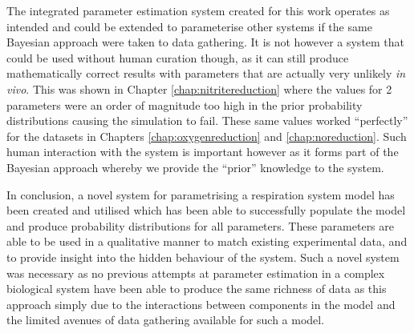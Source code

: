 The integrated parameter estimation system created for this work operates as intended and could be extended to parameterise other systems if the same Bayesian approach were taken to data gathering. It is not however a system that could be used without human curation though, as it can still produce mathematically correct results with parameters that are actually very unlikely \textit{in vivo}. This was shown in Chapter \ref{chap:nitritereduction} where the values for 2 parameters were an order of magnitude too high in the prior probability distributions causing the simulation to fail. These same values worked ``perfectly'' for the datasets in Chapters \ref{chap:oxygenreduction} and \ref{chap:noreduction}. Such human interaction with the system is important however as it forms part of the Bayesian approach whereby we provide the ``prior'' knowledge to the system.

In conclusion, a novel system for parametrising a respiration system model has been created and utilised which has been able to successfully populate the model and produce probability distributions for all parameters. These parameters are able to be used in a qualitative manner to match existing experimental data, and to provide insight into the hidden behaviour of the system. Such a novel system was necessary as no previous attempts at parameter estimation in a complex biological system have been able to produce the same richness of data as this approach simply due to the interactions between components in the model and the limited avenues of data gathering available for such a model.